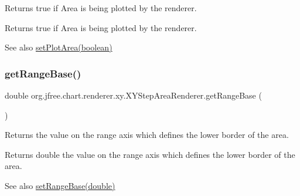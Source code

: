 Returns true if Area is being plotted by the renderer.

\begin{DoxyReturn}{Returns}
{\ttfamily true} if Area is being plotted by the renderer.
\end{DoxyReturn}
\begin{DoxySeeAlso}{See also}
\mbox{\hyperlink{classorg_1_1jfree_1_1chart_1_1renderer_1_1xy_1_1_x_y_step_area_renderer_a03aa941046cf94fb1a298933cc3c2df8}{set\+Plot\+Area(boolean)}} 
\end{DoxySeeAlso}
\mbox{\label{classorg_1_1jfree_1_1chart_1_1renderer_1_1xy_1_1_x_y_step_area_renderer_af5930ee5f41050b92457a62b6f67be23}} 
\subsubsection{\texorpdfstring{get\+Range\+Base()}{getRangeBase()}}
{\footnotesize\ttfamily double org.\+jfree.\+chart.\+renderer.\+xy.\+X\+Y\+Step\+Area\+Renderer.\+get\+Range\+Base (\begin{DoxyParamCaption}{ }\end{DoxyParamCaption})}

Returns the value on the range axis which defines the \textquotesingle{}lower\textquotesingle{} border of the area.

\begin{DoxyReturn}{Returns}
{\ttfamily double} the value on the range axis which defines the \textquotesingle{}lower\textquotesingle{} border of the area.
\end{DoxyReturn}
\begin{DoxySeeAlso}{See also}
\mbox{\hyperlink{classorg_1_1jfree_1_1chart_1_1renderer_1_1xy_1_1_x_y_step_area_renderer_ada3dfcb79ef9abbbf17d2488e3fdfa31}{set\+Range\+Base(double)}} 
\end{DoxySeeAlso}
\mbox{\label{classorg_1_1jfree_1_1chart_1_1renderer_1_1xy_1_1_x_y_step_area_renderer_a788e4b8ad2e8a0cafbcaace5916ff067}} 
